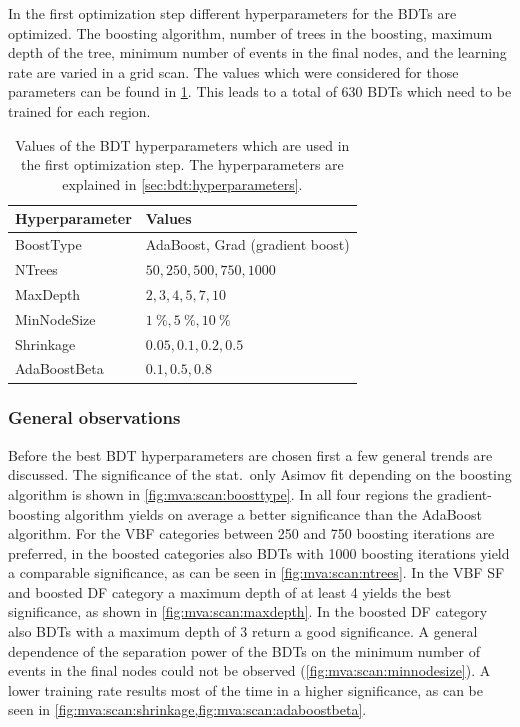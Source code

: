 In the first optimization step different hyperparameters for the BDTs
are optimized.
The boosting algorithm, number of trees in the boosting, maximum depth of the tree, minimum number of events in the final nodes,
and the learning rate are varied in a grid scan.
The values which were considered for those parameters can be found in \cref{tab:mva:hpyerparameterscan}.
This leads to a total of 630 BDTs which need to be trained for each region.

\begin{table}[htpb]
    \centering
    \caption{Values of the BDT hyperparameters which are used in the first optimization step.
    The hyperparameters are explained in \cref{sec:bdt:hyperparameters}.}\label{tab:mva:hpyerparameterscan}
    \begin{tabular}{ll}
        \toprule
        Hyperparameter   & Values \\ \midrule
        BoostType   & AdaBoost, Grad (gradient boost) \\
        NTrees      & $50, 250, 500, 750, 1000$ \\
        MaxDepth    & $2, 3, 4, 5, 7, 10$ \\
        MinNodeSize & $\SI{1}{\percent}, \SI{5}{\percent}, \SI{10}{\percent}$ \\
        Shrinkage   & $0.05, 0.1, 0.2, 0.5$ \\
        AdaBoostBeta& $0.1, 0.5, 0.8$ \\
        \bottomrule
    \end{tabular}
\end{table}

\subsubsection{General observations}

Before the best BDT hyperparameters are chosen first a few general trends are discussed.
The significance of the stat.\ only Asimov fit depending on the boosting algorithm is shown in \cref{fig:mva:scan:boosttype}.
In all four regions the gradient-boosting algorithm yields on average a better significance than the AdaBoost algorithm.
For the VBF categories between 250 and 750 boosting iterations are preferred, in the boosted categories also BDTs with
1000 boosting iterations yield a comparable significance, as can be seen in \cref{fig:mva:scan:ntrees}.
In the VBF SF and boosted DF category a maximum depth of at least 4 yields the best significance, as shown
in \cref{fig:mva:scan:maxdepth}.
In the boosted DF category also BDTs with a maximum depth of 3 return a good significance.
A general dependence of the separation power of the BDTs on the minimum number of events in the final
nodes could not be observed (\cref{fig:mva:scan:minnodesize}).
A lower training rate results most of the time in a higher significance, as can be seen in \cref{fig:mva:scan:shrinkage,fig:mva:scan:adaboostbeta}.

